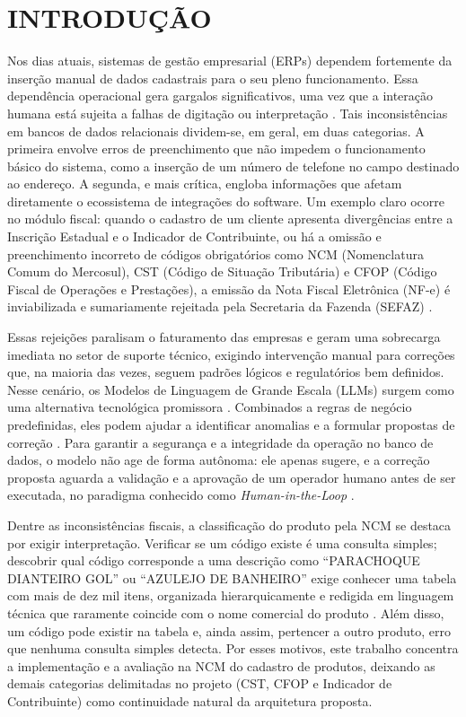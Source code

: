 \chapter{INTRODUÇÃO}

Nos dias atuais, sistemas de gestão empresarial (ERPs) dependem fortemente da inserção manual de dados cadastrais para o seu pleno funcionamento. Essa dependência operacional gera gargalos significativos, uma vez que a interação humana está sujeita a falhas de digitação ou interpretação \cite{Mehta2025ERPDataQuality}. Tais inconsistências em bancos de dados relacionais dividem-se, em geral, em duas categorias. A primeira envolve erros de preenchimento que não impedem o funcionamento básico do sistema, como a inserção de um número de telefone no campo destinado ao endereço. A segunda, e mais crítica, engloba informações que afetam diretamente o ecossistema de integrações do software. Um exemplo claro ocorre no módulo fiscal: quando o cadastro de um cliente apresenta divergências entre a Inscrição Estadual e o Indicador de Contribuinte, ou há a omissão e preenchimento incorreto de códigos obrigatórios como NCM (Nomenclatura Comum do Mercosul), CST (Código de Situação Tributária) e CFOP (Código Fiscal de Operações e Prestações), a emissão da Nota Fiscal Eletrônica (NF-e) é inviabilizada e sumariamente rejeitada pela Secretaria da Fazenda (SEFAZ) \cite{brasil2020moc}.

Essas rejeições paralisam o faturamento das empresas e geram uma sobrecarga imediata no setor de suporte técnico, exigindo intervenção manual para correções que, na maioria das vezes, seguem padrões lógicos e regulatórios bem definidos. Nesse cenário, os Modelos de Linguagem de Grande Escala (LLMs) surgem como uma alternativa tecnológica promissora \cite{Wang2023LLMAgentsSurvey}. Combinados a regras de negócio predefinidas, eles podem ajudar a identificar anomalias e a formular propostas de correção \cite{Roychowdhury2025NLIDB}. Para garantir a segurança e a integridade da operação no banco de dados, o modelo não age de forma autônoma: ele apenas sugere, e a correção proposta aguarda a validação e a aprovação de um operador humano antes de ser executada, no paradigma conhecido como \textit{Human-in-the-Loop} \cite{Cheng2026DecoupledHITL}.

Dentre as inconsistências fiscais, a classificação do produto pela NCM se destaca por exigir interpretação. Verificar se um código existe é uma consulta simples; descobrir qual código corresponde a uma descrição como ``PARACHOQUE DIANTEIRO GOL'' ou ``AZULEJO DE BANHEIRO'' exige conhecer uma tabela com mais de dez mil itens, organizada hierarquicamente e redigida em linguagem técnica que raramente coincide com o nome comercial do produto \cite{receita2026ncm}. Além disso, um código pode existir na tabela e, ainda assim, pertencer a outro produto, erro que nenhuma consulta simples detecta. Por esses motivos, este trabalho concentra a implementação e a avaliação na NCM do cadastro de produtos, deixando as demais categorias delimitadas no projeto (CST, CFOP e Indicador de Contribuinte) como continuidade natural da arquitetura proposta.

